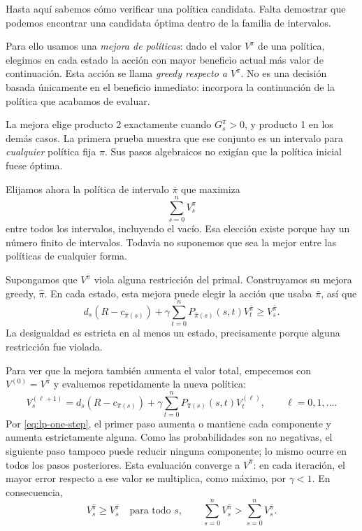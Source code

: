 \documentclass[11pt,a4paper]{article}
\begin{document}
Hasta aquí sabemos cómo verificar una política candidata. Falta
demostrar que podemos encontrar una candidata óptima dentro de la
familia de intervalos.

Para ello usamos una \emph{mejora de políticas}: dado el valor
$V^\pi$ de una política, elegimos en cada estado la acción con mayor
beneficio actual más valor de continuación. Esta acción se llama
\emph{greedy respecto a $V^\pi$}. No es una decisión basada únicamente
en el beneficio inmediato: incorpora la continuación de la política
que acabamos de evaluar.

La mejora elige producto 2 exactamente cuando $G_s^\pi>0$, y producto
1 en los demás casos. La primera prueba muestra que ese conjunto es
un intervalo para \emph{cualquier} política fija $\pi$. Sus pasos
algebraicos no exigían que la política inicial fuese óptima.

Elijamos ahora la política de intervalo $\bar\pi$ que maximiza
\[
\sum_{s=0}^{n}V_s^\pi
\]
entre todos los intervalos, incluyendo el vacío. Esa elección existe
porque hay un número finito de intervalos. Todavía no suponemos que
sea la mejor entre las políticas de cualquier forma.

Supongamos que $V^{\bar\pi}$ viola alguna restricción del primal.
Construyamos su mejora greedy, $\widehat\pi$. En cada estado, esta
mejora puede elegir la acción que usaba $\bar\pi$, así que
\begin{equation}
d_s(R-c_{\widehat\pi(s)})
 +\gamma\sum_{t=0}^{n}P_{\widehat\pi(s)}(s,t)V_t^{\bar\pi}
 \ge V_s^{\bar\pi}.
\label{eq:lp-one-step}
\end{equation}
La desigualdad es estricta en al menos un estado, precisamente porque
alguna restricción fue violada.

Para ver que la mejora también aumenta el valor total, empecemos con
$V^{(0)}=V^{\bar\pi}$ y evaluemos repetidamente la nueva política:
\[
V_s^{(\ell+1)}=d_s(R-c_{\widehat\pi(s)})
  +\gamma\sum_{t=0}^{n}P_{\widehat\pi(s)}(s,t)V_t^{(\ell)},
\qquad \ell=0,1,\ldots.
\]
Por \eqref{eq:lp-one-step}, el primer paso aumenta o mantiene cada
componente y aumenta estrictamente alguna. Como las probabilidades
son no negativas, el siguiente paso tampoco puede reducir ninguna
componente; lo mismo ocurre en todos los pasos posteriores. Esta
evaluación converge a $V^{\widehat\pi}$: en cada iteración, el mayor
error respecto a ese valor se multiplica, como máximo, por
$\gamma<1$. En consecuencia,
\[
V_s^{\widehat\pi}\ge V_s^{\bar\pi}\quad\text{para todo }s,
\qquad
\sum_{s=0}^{n}V_s^{\widehat\pi}
   >\sum_{s=0}^{n}V_s^{\bar\pi}.
\]
\end{document}

